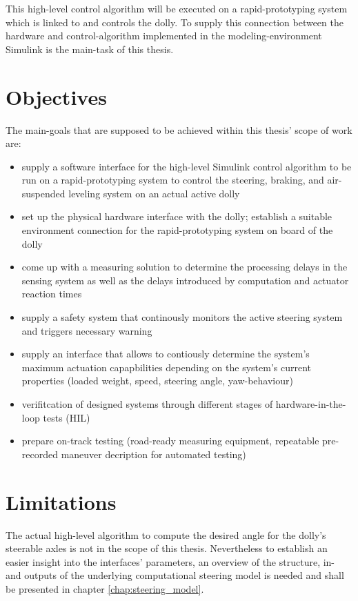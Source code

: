 \documentclass[ExampleMasters.tex]{subfiles}
\begin{document}
This high-level control algorithm will be executed on a rapid-prototyping system which is linked to and controls the dolly. To supply this connection between the hardware and control-algorithm implemented in the modeling-environment Simulink is the main-task of this thesis.   

\section{Objectives}
\label{sec:objectives}
The main-goals that are supposed to be achieved within this thesis' scope of work are: 

\begin{itemize}
	\item{supply a software interface for the high-level Simulink control algorithm to be run on a rapid-prototyping system to control the steering, braking, and air-suspended leveling system on an actual active dolly}
	\item{set up the physical hardware interface with the dolly; establish a suitable environment connection for the rapid-prototyping system on board of the dolly} 
	\item{come up with a measuring solution to determine the processing delays in the sensing system as well as the delays introduced by computation and actuator reaction times}  
	\item{supply a safety system that continously monitors the active steering system and triggers necessary warning}
	\item{supply an interface that allows to contiously determine the system's maximum actuation capapbilities depending on the system's current properties (loaded weight, speed, steering angle, yaw-behaviour)}
	\item{verifitcation of designed systems through different stages of hardware-in-the-loop tests (HIL)}
	\item{prepare on-track testing (road-ready measuring equipment, repeatable pre-recorded maneuver decription for automated testing)}
	
\end{itemize}



\section{Limitations}
\label{sec:limitations}
The actual high-level algorithm to compute the desired angle for the dolly's steerable axles is not in the scope of this thesis. Nevertheless to establish an easier insight into the interfaces' parameters, an overview of the structure, in- and outputs of the underlying computational steering model is needed and shall be presented in chapter \ref{chap:steering_model}. 
\end{document}
